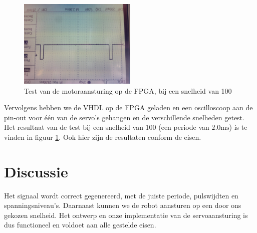\documentclass{report}
\begin{document}
\begin{figure}[H]
	\centering
	\includegraphics[width=0.5\textwidth]{resource/motor-control-scoop}
	\caption{Test van de motoraansturing op de FPGA, bij een snelheid van 100}
	\label{fig:motorcontrol-scoop}
\end{figure}

Vervolgens hebben we de VHDL op de FPGA geladen en een oscilloscoop aan de pin-out voor één van de servo's gehangen en de verschillende snelheden getest. Het resultaat van de test bij een snelheid van 100 (een periode van $2.0\mathrm{ms}$) is te vinden in figuur \ref{fig:motorcontrol-scoop}. Ook hier zijn de resultaten conform de eisen.

\section{Discussie}
\label{sec:servo-disc}

Het signaal wordt correct gegenereerd, met de juiste periode, pulswijdten en spanningsniveau's.
Daarnaast kunnen we de robot aansturen op een door ons gekozen snelheid.
Het ontwerp en onze implementatie van de servoaansturing is dus functioneel en voldoet aan alle gestelde eisen.
\end{document}
